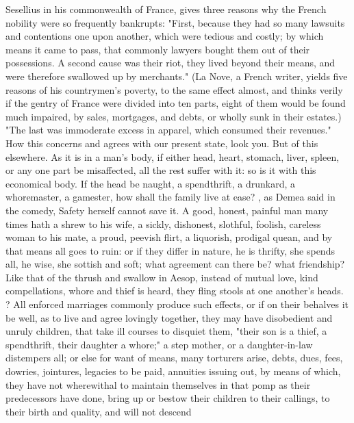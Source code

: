 Sesellius in his commonwealth of France, gives three
reasons why the French nobility were so frequently bankrupts: "First, because
they had so many lawsuits and contentions one upon another, which were tedious
and costly; by which means it came to pass, that commonly lawyers bought them
out of their possessions. A second cause was their riot, they lived beyond
their means, and were therefore swallowed up by merchants." (La Nove, a French
writer, yields five reasons of his countrymen's poverty, to the same effect
almost, and thinks verily if the gentry of France were divided into ten parts,
eight of them would be found much impaired, by sales, mortgages, and debts, or
wholly sunk in their estates.) "The last was immoderate excess in apparel,
which consumed their revenues." How this concerns and agrees with our present
state, look you. But of this elsewhere. As it is in a man's body, if either
head, heart, stomach, liver, spleen, or any one part be misaffected, all the
rest suffer with it: so is it with this economical body. If the head be naught,
a spendthrift, a drunkard, a whoremaster, a gamester, how shall the family live
at ease? , as Demea said in the comedy, Safety herself cannot save
it. A good, honest, painful man many times hath a shrew to his wife, a sickly,
dishonest, slothful, foolish, careless woman to his mate, a proud, peevish
flirt, a liquorish, prodigal quean, and by that means all goes to ruin: or if
they differ in nature, he is thrifty, she spends all, he wise, she sottish and
soft; what agreement can there be? what friendship? Like that of the thrush and
swallow in Aesop, instead of mutual love, kind compellations, whore and thief
is heard, they fling stools at one another's heads.
? All enforced
marriages commonly produce such effects, or if on their behalves it be well, as
to live and agree lovingly together, they may have disobedient and unruly
children, that take ill courses to disquiet them, "their
son is a thief, a spendthrift, their daughter a whore;" a step
mother, or a daughter-in-law distempers all;
or else for want of means, many torturers arise, debts,
dues, fees, dowries, jointures, legacies to be paid, annuities issuing out, by
means of which, they have not wherewithal to maintain themselves in that pomp
as their predecessors have done, bring up or bestow their children to their
callings, to their birth and quality, and will not descend

